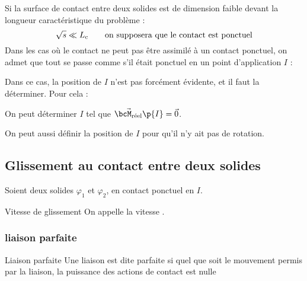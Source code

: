     Si la surface de contact entre deux solides est de dimension faible devant la longueur caractéristique du problème :
    \[ \sqrt{s} \ll L_\text c \qquad\text{on supposera que le contact est ponctuel}\]
    Dans les cas où le contact ne peut pas être assimilé à un contact ponctuel, on admet que tout se passe comme s'il était ponctuel en un point d'application $I$ :
    \begin{center}
    \end{center}
    Dans ce cas, la position de $I$ n'est pas forcément évidente, et il faut la déterminer. Pour cela :
    \begin{enumerate}
        \itt On peut déterminer $I$ tel que $\vec{\bcM_\text{réel}}\p{I} = \vec 0$.
        
        \itt On peut aussi définir la position de $I$ pour qu'il n'y ait pas de rotation.
    \end{enumerate}
    
    \subsection{Glissement au contact entre deux solides}
    
    Soient deux solides $\varphi_1$ et $\varphi_2$, en contact ponctuel en $I$.
    \begin{definition}{Vitesse de glissement}
        On appelle  la vitesse .
    \end{definition}
    

    \subsubsection{liaison parfaite}
    
        \begin{definition}{Liaison parfaite}{}
            Une liaison est dite parfaite si quel que soit le mouvement permis par la liaison, la puissance des actions de contact est nulle
        \end{definition}
    
